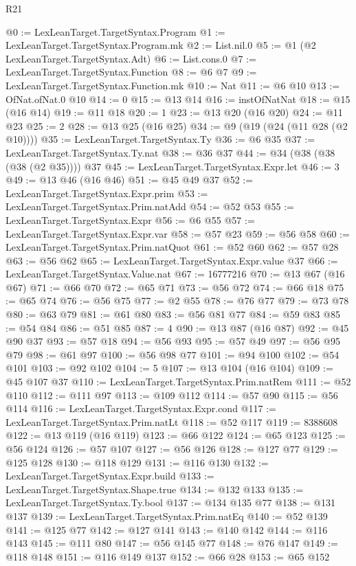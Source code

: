 \begin{lexlean}{R21}
\begin{coremodule}
@0 := LexLeanTarget.TargetSyntax.Program
@1 := LexLeanTarget.TargetSyntax.Program.mk
@2 := List.nil.{0}
@5 := @1 (@2 LexLeanTarget.TargetSyntax.Adt)
@6 := List.cons.{0}
@7 := LexLeanTarget.TargetSyntax.Function
@8 := @6 @7
@9 := LexLeanTarget.TargetSyntax.Function.mk
@10 := Nat
@11 := @6 @10
@13 := OfNat.ofNat.{0} @10
@14 := 0
@15 := @13 @14
@16 := instOfNatNat
@18 := @15 (@16 @14)
@19 := @11 @18
@20 := 1
@23 := @13 @20 (@16 @20)
@24 := @11 @23
@25 := 2
@28 := @13 @25 (@16 @25)
@34 := @9 (@19 (@24 (@11 @28 (@2 @10))))
@35 := LexLeanTarget.TargetSyntax.Ty
@36 := @6 @35
@37 := LexLeanTarget.TargetSyntax.Ty.nat
@38 := @36 @37
@44 := @34 (@38 (@38 (@38 (@2 @35)))) @37
@45 := LexLeanTarget.TargetSyntax.Expr.let
@46 := 3
@49 := @13 @46 (@16 @46)
@51 := @45 @49 @37
@52 := LexLeanTarget.TargetSyntax.Expr.prim
@53 := LexLeanTarget.TargetSyntax.Prim.natAdd
@54 := @52 @53
@55 := LexLeanTarget.TargetSyntax.Expr
@56 := @6 @55
@57 := LexLeanTarget.TargetSyntax.Expr.var
@58 := @57 @23
@59 := @56 @58
@60 := LexLeanTarget.TargetSyntax.Prim.natQuot
@61 := @52 @60
@62 := @57 @28
@63 := @56 @62
@65 := LexLeanTarget.TargetSyntax.Expr.value @37
@66 := LexLeanTarget.TargetSyntax.Value.nat
@67 := 16777216
@70 := @13 @67 (@16 @67)
@71 := @66 @70
@72 := @65 @71
@73 := @56 @72
@74 := @66 @18
@75 := @65 @74
@76 := @56 @75
@77 := @2 @55
@78 := @76 @77
@79 := @73 @78
@80 := @63 @79
@81 := @61 @80
@83 := @56 @81 @77
@84 := @59 @83
@85 := @54 @84
@86 := @51 @85
@87 := 4
@90 := @13 @87 (@16 @87)
@92 := @45 @90 @37
@93 := @57 @18
@94 := @56 @93
@95 := @57 @49
@97 := @56 @95 @79
@98 := @61 @97
@100 := @56 @98 @77
@101 := @94 @100
@102 := @54 @101
@103 := @92 @102
@104 := 5
@107 := @13 @104 (@16 @104)
@109 := @45 @107 @37
@110 := LexLeanTarget.TargetSyntax.Prim.natRem
@111 := @52 @110
@112 := @111 @97
@113 := @109 @112
@114 := @57 @90
@115 := @56 @114
@116 := LexLeanTarget.TargetSyntax.Expr.cond
@117 := LexLeanTarget.TargetSyntax.Prim.natLt
@118 := @52 @117
@119 := 8388608
@122 := @13 @119 (@16 @119)
@123 := @66 @122
@124 := @65 @123
@125 := @56 @124
@126 := @57 @107
@127 := @56 @126
@128 := @127 @77
@129 := @125 @128
@130 := @118 @129
@131 := @116 @130
@132 := LexLeanTarget.TargetSyntax.Expr.build
@133 := LexLeanTarget.TargetSyntax.Shape.true
@134 := @132 @133
@135 := LexLeanTarget.TargetSyntax.Ty.bool
@137 := @134 @135 @77
@138 := @131 @137
@139 := LexLeanTarget.TargetSyntax.Prim.natEq
@140 := @52 @139
@141 := @125 @77
@142 := @127 @141
@143 := @140 @142
@144 := @116 @143
@145 := @111 @80
@147 := @56 @145 @77
@148 := @76 @147
@149 := @118 @148
@151 := @116 @149 @137
@152 := @66 @28
@153 := @65 @152

\end{coremodule}
\end{lexlean}
